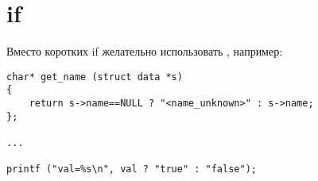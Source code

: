 ﻿\section{if}

Вместо коротких if желательно использовать , например:

\begin{lstlisting}
char* get_name (struct data *s)
{
	return s->name==NULL ? "<name_unknown>" : s->name;
};

...

printf ("val=%s\n", val ? "true" : "false");
\end{lstlisting}



